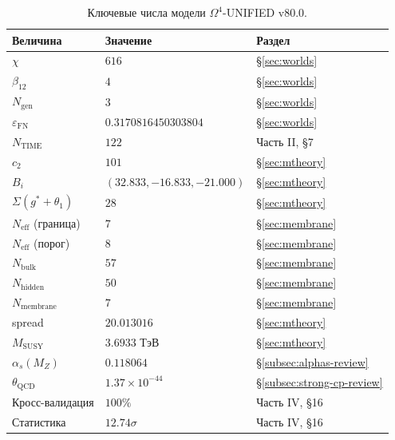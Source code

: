 \documentclass[11pt,a4paper]{article}
\newcommand{\Om}{\Omega^4}
\newcommand{\Ngen}{N_{\text{gen}}}
\newcommand{\Neff}{N_{\text{eff}}}
\newcommand{\Nbulk}{N_{\text{bulk}}}
\newcommand{\Nhidden}{N_{\text{hidden}}}
\newcommand{\Nmembrane}{N_{\text{membrane}}}
\newcommand{\epsFN}{\varepsilon_{\text{FN}}}
\theoremstyle{definition}
\begin{document}
\begin{table}[htbp]
\centering
\caption{Ключевые числа модели $\Om$-UNIFIED v80.0.}
\label{tab:key-numbers}
\begin{tabular}{lll}
\toprule
Величина & Значение & Раздел \\
\midrule
$\chi$ & $616$ & §\ref{sec:worlds} \\
$\beta_{12}$ & $4$ & §\ref{sec:worlds} \\
$\Ngen$ & $3$ & §\ref{sec:worlds} \\
$\epsFN$ & $0.3170816450303804$ & §\ref{sec:worlds} \\
$N_{\text{TIME}}$ & $122$ & Часть II, §7 \\
$c_2$ & $101$ & §\ref{sec:mtheory} \\
$B_i$ & $(32.833, -16.833, -21.000)$ & §\ref{sec:mtheory} \\
$\Sigma(g^*+\theta_1)$ & $28$ & §\ref{sec:mtheory} \\
$\Neff$ (граница) & $7$ & §\ref{sec:membrane} \\
$\Neff$ (порог) & $8$ & §\ref{sec:membrane} \\
$\Nbulk$ & $57$ & §\ref{sec:membrane} \\
$\Nhidden$ & $50$ & §\ref{sec:membrane} \\
$\Nmembrane$ & $7$ & §\ref{sec:membrane} \\
spread & $20.013016$ & §\ref{sec:mtheory} \\
$M_{\text{SUSY}}$ & $3.6933$ ТэВ & §\ref{sec:mtheory} \\
$\alpha_s(M_Z)$ & $0.118064$ & §\ref{subsec:alphas-review} \\
$\theta_{\text{QCD}}$ & $1.37 \times 10^{-44}$ & §\ref{subsec:strong-cp-review} \\
Кросс-валидация & $100\%$ & Часть IV, §16 \\
Статистика & $12.74\sigma$ & Часть IV, §16 \\
\bottomrule
\end{tabular}
\end{table}
\end{document}

